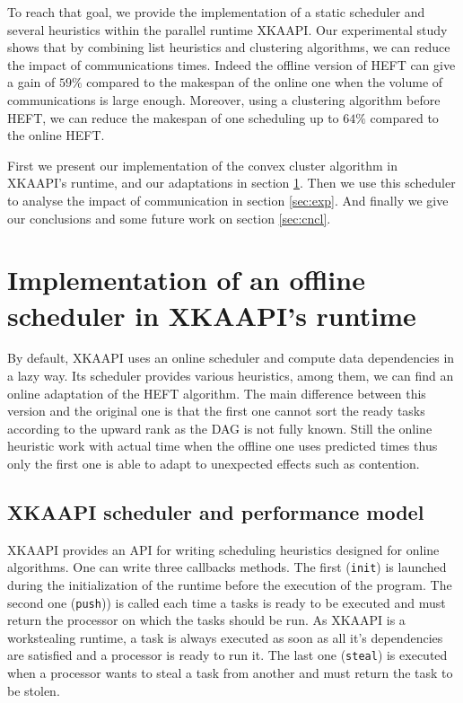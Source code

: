 \documentclass[10pt, conference, compsocconf,pdftex,dvipsnames]{IEEEtran}
\begin{document}
To reach that goal, we provide the implementation of  a static scheduler and
several heuristics within the parallel runtime XKAAPI. Our experimental study
shows that by combining list heuristics and clustering algorithms, we can
reduce the impact of communications times. Indeed the offline version of HEFT
can give a gain of $59\%$ compared to the makespan of the online one when the
volume of communications is large enough.  Moreover, using a clustering
algorithm before HEFT, we can reduce the makespan of one scheduling up to
$64\%$ compared to the online HEFT.

First we present our implementation of the convex cluster algorithm in
XKAAPI's runtime, and our adaptations  in section \ref{sec:impl}. Then we use
this scheduler to analyse the impact of communication in section
\ref{sec:exp}. And finally we give our conclusions and some future work on
section \ref{sec:cncl}.

\section{Implementation of an offline scheduler in XKAAPI's runtime}
\label{sec:impl}

By default, XKAAPI uses an online scheduler and compute data dependencies in a
lazy way. Its scheduler provides various heuristics, among them, we can find
an online adaptation of the HEFT algorithm. The main difference between this
version and the original one is that the first one cannot sort the ready tasks
according to the upward rank as the DAG is not fully known.  Still the online
heuristic work with actual time when the offline one uses predicted times thus
only the first one is able to adapt to unexpected effects such as contention.

\subsection{XKAAPI scheduler and performance model}
\label{sec:impl-kaapi}

XKAAPI provides an API for writing scheduling heuristics designed for online
algorithms. One can write three callbacks methods. The first (\texttt{init})
is launched during the initialization of the runtime before the execution of
the program.  The second one (\texttt{push})) is called each time a tasks is
ready to be executed and must return the processor on which the tasks should
be run. As XKAAPI is a workstealing runtime, a task is always executed as soon
as all it's dependencies are satisfied and a processor is ready to run it. The
last one (\texttt{steal}) is executed when a processor wants to steal a task
from another and must return the task to be stolen.
\end{document}
